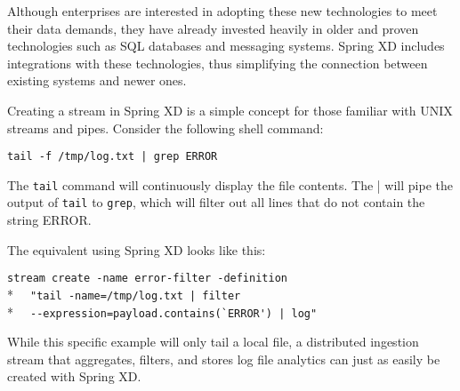 Although enterprises are interested in adopting these new technologies to
meet their data demands, they have already invested heavily in older and proven
technologies such as SQL databases and messaging systems. Spring XD includes
integrations with these technologies, thus simplifying the connection between
existing systems and newer ones.

Creating a stream in Spring XD is a simple concept for those familiar with
UNIX streams and pipes. Consider the following shell command:

\verb;tail -f /tmp/log.txt | grep ERROR;

The \texttt{tail} command will continuously display the file contents. The |
will pipe the output of \texttt{tail} to \texttt{grep}, which will filter 
out all lines that do not contain the string ERROR.

The equivalent using Spring XD looks like this:

\verb;stream create -name error-filter -definition;\\*
\verb;  "tail -name=/tmp/log.txt | filter;\\*
\verb;  --expression=payload.contains(`ERROR') | log";

While this specific example will only tail a local file, a distributed 
ingestion stream that aggregates, filters, and stores log file analytics
can just as easily be created with Spring XD.
